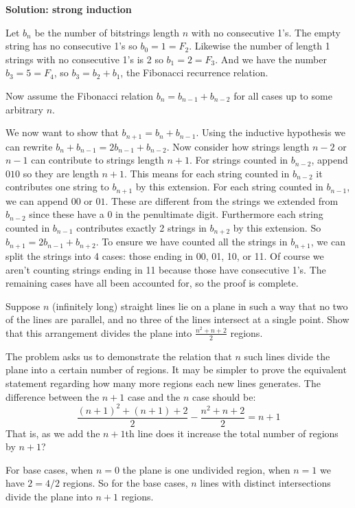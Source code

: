 \documentclass{article}
\begin{document}
\textbf{Solution: strong induction}

Let $b_n$ be the number of bitstrings length $n$ with no consecutive 1's. The empty string has no consecutive 1's so $b_0 = 1 = F_2$. Likewise the number of length 1 strings with no consecutive 1's is 2 so $b_1 = 2 = F_3$. And we have the number $b_3 = 5 = F_4$, so $b_3 = b_2 + b_1$, the Fibonacci recurrence relation.

Now assume the Fibonacci relation $b_n = b_{n-1} + b_{n-2}$ for all cases up to some arbitrary $n$.

We now want to show that $b_{n+1} = b_n + b_{n-1}$. Using the inductive hypothesis we can rewrite $b_n + b_{n-1} = 2b_{n-1} + b_{n-2}$. Now consider how strings length $n-2$ or $n-1$ can contribute to strings length $n+1$. For strings counted in $b_{n-2}$, append $010$ so they are length $n+1$. This means for each string counted in $b_{n-2}$ it contributes one string to $b_{n+1}$ by this extension. For each string counted in $b_{n-1}$, we can append $00$ or $01$. These are different from the strings we extended from $b_{n-2}$ since these have a 0 in the penultimate digit. Furthermore each string counted in $b_{n-1}$ contributes exactly 2 strings in $b_{n+2}$ by this extension. So $b_{n+1} = 2b_{n-1} + b_{n+2}$. To ensure we have counted all the strings in $b_{n+1}$, we can split the strings into 4 cases: those ending in 00, 01, 10, or 11. Of course we aren't counting strings ending in 11 because those have consecutive 1's. The remaining cases have all been accounted for, so the proof is complete.

\begin{problem}
Suppose $n$ (infinitely long) straight lines lie on a plane in such a way that no two of the lines are parallel, and no three of the lines intersect at a single point. Show that this arrangement divides the plane into $\frac{n^2 + n + 2}{2}$ regions.
\end{problem}
The problem asks us to demonstrate the relation that $n$ such lines divide the plane into a certain number of regions. It may be simpler to prove the equivalent statement regarding how many more regions each new lines generates. The difference between the $n+1$ case and the $n$ case should be:
$$\frac{(n+1)^2 + (n+1) + 2}{2} - \frac{n^2 + n + 2}{2} = n+1$$
That is, as we add the $n+1$th line does it increase the total number of regions by $n+1$?

For base cases, when $n = 0$ the plane is one undivided region, when $n = 1$ we have $2 = 4/2$ regions. So for the base cases, $n$ lines with distinct intersections divide the plane into $n+1$ regions.
\end{document}
